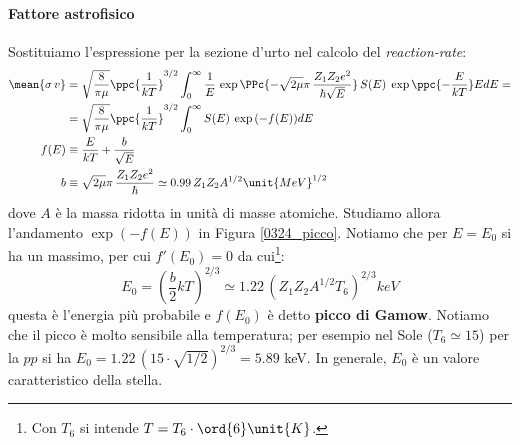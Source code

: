 \paragraph{Fattore astrofisico}
Sostituiamo l'espressione per la sezione d'urto nel calcolo del \textit{reaction-rate}:
\begin{align*}
\mean{\sigma\, v } &= \sqrt{\frac{8}{\pi\mu}} \ppc{\frac{1}{kT}}^{3/2} \int_0^\infty \frac{1}{E}\,\exp{\PPc{-\sqrt{2\mu}\pi\, \frac{Z_1Z_2 e^2}{\hbar \sqrt{E}}}}\, S(E) \; \exp{\ppc{-\frac{E}{kT}}} E dE = \\
&= \sqrt{\frac{8}{\pi\mu}} \ppc{\frac{1}{kT}}^{3/2} \int_0^\infty S(E) \: \exp{(-f(E))} dE\\
f(E) &\equiv \frac{E}{kT} + \frac{b}{\sqrt{E}}\\
b &\equiv \sqrt{2\mu}\pi\, \frac{Z_1Z_2 e^2}{\hbar} \simeq 0.99 \, Z_1 Z_2 A^{1/2} \unit{MeV}^{1/2}
\end{align*}
\noindent dove $A$ è la massa ridotta in unità di masse atomiche. Studiamo allora l'andamento $\exp{(-f(E))}$ in Figura \ref{0324_picco}. Notiamo che per $E=E_0$ si ha un massimo, per cui $f'(E_0) = 0$ da cui\footnote{Con $T_6$ si intende $T = T_6 \cdot \ord{6}\unit{K}$.}: 
$$E_0 = (\frac{b}{2}kT)^{2/3} \simeq 1.22 \, (Z_1Z_2 A^{1/2} T_6)^{2/3}\unit{keV} $$
questa è l'energia più probabile e $f(E_0)$ è detto \textbf{picco di Gamow}. Notiamo che il picco è molto sensibile alla temperatura; per esempio nel Sole ($T_6\simeq 15$) per la $pp$ si ha $E_0 = 1.22\, (15\cdot \sqrt{1/2})^{2/3} = 5.89$ keV. In generale, $E_0$ è un valore caratteristico della stella.
